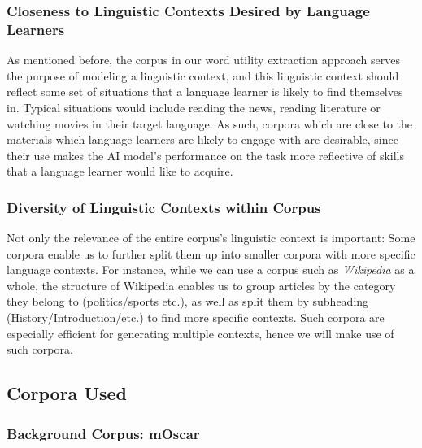 \subsubsection{Closeness to Linguistic Contexts Desired by Language Learners}
As mentioned before, the corpus in our word utility extraction approach serves the purpose of modeling a linguistic context, and this linguistic context should reflect some set of situations that a language learner is likely to find themselves in.
Typical situations would include reading the news, reading literature or watching movies in their target language.
As such, corpora which are close to the materials which language learners are likely to engage with are desirable, since their use makes the AI model's performance on the task more reflective of skills that a language learner would like to acquire.

\subsubsection{Diversity of Linguistic Contexts within Corpus}
Not only the relevance of the entire corpus's linguistic context is important:
Some corpora enable us to further split them up into smaller corpora with more specific language contexts.
For instance, while we can use a corpus such as \textit{Wikipedia} as a whole, the structure of Wikipedia enables us to group articles by the category they belong to (politics/sports etc.), as well as split them by subheading (History/Introduction/etc.) to find more specific contexts.
Such corpora are especially efficient for generating multiple contexts, hence we will make use of such corpora.



\subsection{Corpora Used}

\subsubsection{Background Corpus: mOscar}


\cite{futeralMOSCARLargescaleMultilingual2024}

